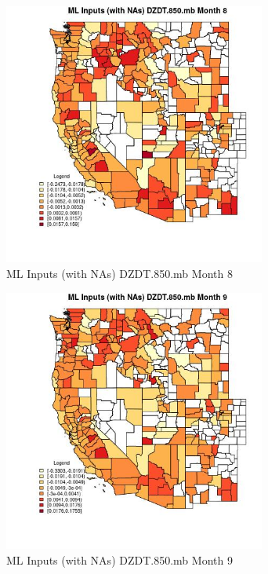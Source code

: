 \begin{figure} 
\centering  
\includegraphics[width=0.77\textwidth]{Code_Outputs/Report_ML_input_PM25_Step4_part_f_de_duplicated_aves_prioritize_24hr_obswNAs_CountyDZDT850mbmedianMonth8.jpg} 
\caption{\label{fig:Report_ML_input_PM25_Step4_part_f_de_duplicated_aves_prioritize_24hr_obswNAsCountyDZDT850mbmedianMonth8}ML Inputs (with NAs) DZDT.850.mb Month 8} 
\end{figure} 
 

\begin{figure} 
\centering  
\includegraphics[width=0.77\textwidth]{Code_Outputs/Report_ML_input_PM25_Step4_part_f_de_duplicated_aves_prioritize_24hr_obswNAs_CountyDZDT850mbmedianMonth9.jpg} 
\caption{\label{fig:Report_ML_input_PM25_Step4_part_f_de_duplicated_aves_prioritize_24hr_obswNAsCountyDZDT850mbmedianMonth9}ML Inputs (with NAs) DZDT.850.mb Month 9} 
\end{figure} 
 

